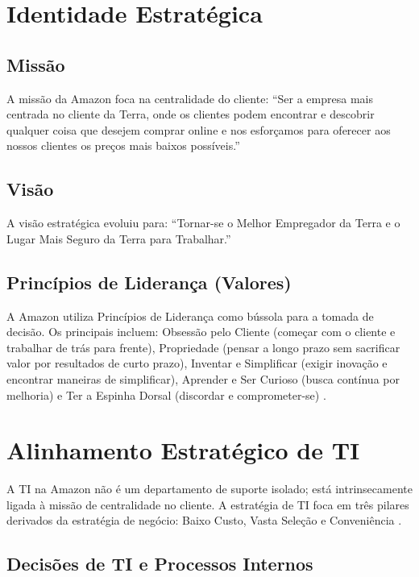 \documentclass[12pt,a4paper,oneside]{article}
\begin{document}
\section{Identidade Estratégica}

\subsection{Missão}

A missão da Amazon foca na centralidade do cliente: ``Ser a empresa mais centrada no cliente da Terra, onde os clientes podem encontrar e descobrir qualquer coisa que desejem comprar online e nos esforçamos para oferecer aos nossos clientes os preços mais baixos possíveis.''

\subsection{Visão}

A visão estratégica evoluiu para: ``Tornar-se o Melhor Empregador da Terra e o Lugar Mais Seguro da Terra para Trabalhar.''

\subsection{Princípios de Liderança (Valores)}

A Amazon utiliza Princípios de Liderança como bússola para a tomada de decisão. Os principais incluem: Obsessão pelo Cliente (começar com o cliente e trabalhar de trás para frente), Propriedade (pensar a longo prazo sem sacrificar valor por resultados de curto prazo), Inventar e Simplificar (exigir inovação e encontrar maneiras de simplificar), Aprender e Ser Curioso (busca contínua por melhoria) e Ter a Espinha Dorsal (discordar e comprometer-se) \cite{kluyver2007}.

\section{Alinhamento Estratégico de TI}

A TI na Amazon não é um departamento de suporte isolado; está intrinsecamente ligada à missão de centralidade no cliente. A estratégia de TI foca em três pilares derivados da estratégia de negócio: Baixo Custo, Vasta Seleção e Conveniência \cite{porter1989}.

\subsection{Decisões de TI e Processos Internos}
\end{document}
